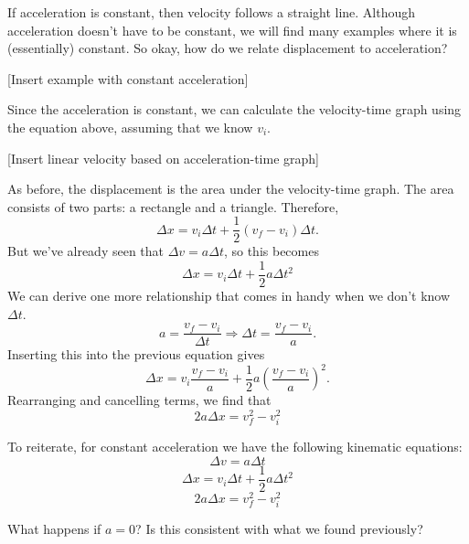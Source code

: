 If acceleration is constant, then velocity follows a straight line. Although acceleration doesn't have to be constant, we will find many examples where it is (essentially) constant. So okay, how do we relate displacement to acceleration?

[Insert example with constant acceleration]
\vspace{4cm}

Since the acceleration is constant, we can calculate the velocity-time graph using the equation above, assuming that we know $v_i$.

[Insert linear velocity based on acceleration-time graph]
\vspace{4cm}


As before, the displacement is the area under the velocity-time graph.
The area consists of two parts: a rectangle and a triangle. Therefore,
$$\Delta{x}=v_i\Delta{t}+\frac{1}{2}(v_f-v_i)\Delta{t}.$$
But we've already seen that $\boxed{\Delta{v}=a\Delta{t}}$, so this becomes
$$\boxed{\Delta{x}=v_i\Delta{t}+\frac{1}{2}a\Delta{t}^2}$$
We can derive one more relationship that comes in handy when we don't know $\Delta{t}$.
$$a=\frac{v_f-v_i}{\Delta{t}}\Rightarrow\Delta{t}=\frac{v_f-v_i}{a}.$$
Inserting this into the previous equation gives
$$\Delta{x}=v_i\frac{v_f-v_i}{a}+\frac{1}{2}a\left(\frac{v_f-v_i}{a}\right)^2.$$
Rearranging and cancelling terms, we find that
$$\boxed{2a\Delta{x}=v_f^2-v_i^2}$$

To reiterate, for constant acceleration we have the following kinematic equations:
$$\Delta{v}=a\Delta{t}$$
$$\Delta{x}=v_i\Delta{t}+\frac{1}{2}a\Delta{t}^2$$
$$2a\Delta{x}=v_f^2-v_i^2$$

What happens if $a=0$? Is this consistent with what we found previously?





